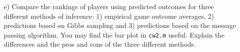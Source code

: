 \documentclass[11pt]{article}
\begin{document}
\begin{enumerate}
\item[e)] Compare the rankings of players using predicted outcomes for three different
  methods of inference: 1) empirical game outcome averages, 2) predictions based on
  Gibbs sampling and 3) predictions based on the message passing
  algorithm.  You may find the bar  plot in \texttt{cw2.m}
  useful. Explain the differences and the pros and cons of the three
  different methods.

\end{enumerate}
\end{document}
